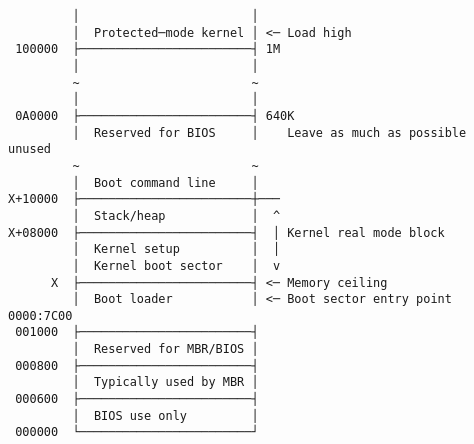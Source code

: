 \documentclass[varwidth=48em]{standalone}
\begin{document}
\begin{verbatim}
         │                        │
         │  Protected─mode kernel │ <─ Load high
 100000  ├────────────────────────┤ 1M
         │                        │
         ~                        ~
         │                        │
 0A0000  ├────────────────────────┤ 640K
         │  Reserved for BIOS     │    Leave as much as possible unused
         ~                        ~
         │  Boot command line     │
X+10000  ├────────────────────────┼───
         │  Stack/heap            │  ^
X+08000  ├────────────────────────┤  │ Kernel real mode block
         │  Kernel setup          │  │
         │  Kernel boot sector    │  v
      X  ├────────────────────────┤ <─ Memory ceiling
         │  Boot loader           │ <─ Boot sector entry point 0000:7C00
 001000  ├────────────────────────┤
         │  Reserved for MBR/BIOS │
 000800  ├────────────────────────┤
         │  Typically used by MBR │
 000600  ├────────────────────────┤
         │  BIOS use only         │
 000000  └────────────────────────┘
\end{verbatim}
\end{document}
